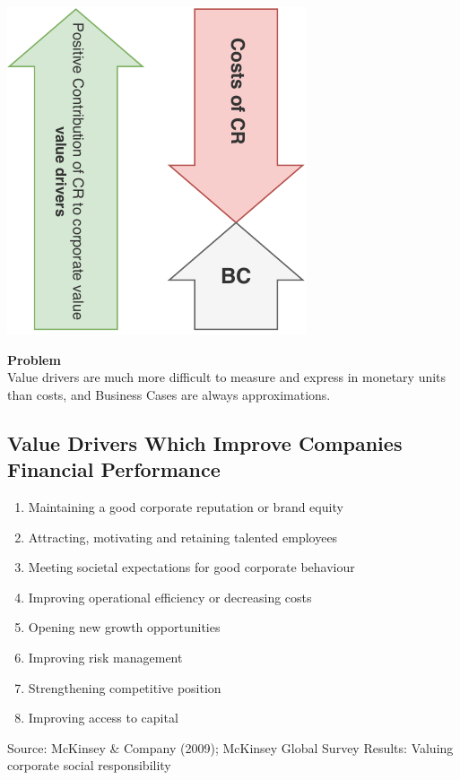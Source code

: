 \documentclass[11pt]{article}
\theoremstyle{definition}
\begin{document}
\vspace{1em}
\noindent
\begin{minipage}{0.35\linewidth}
	\centering
	\includegraphics[width=\linewidth]{img/CR_difficulties.pdf}
\end{minipage}
\hfill
\begin{minipage}{0.6\linewidth}
	\textbf{Problem}\\ Value drivers are much more difficult to measure and express in monetary units than costs, and Business Cases are always approximations.
\end{minipage}

\subsection{Value Drivers Which Improve Companies Financial Performance}
\begin{enumerate}
	\item Maintaining a good corporate reputation or brand equity
	\item Attracting, motivating and retaining talented employees
	\item Meeting societal expectations for good corporate behaviour
	\item Improving operational efficiency or decreasing costs
	\item Opening new growth opportunities
	\item Improving risk management
	\item Strengthening competitive position
	\item Improving access to capital
\end{enumerate}
Source: McKinsey \& Company (2009); McKinsey Global Survey Results: Valuing corporate social responsibility
\end{document}
